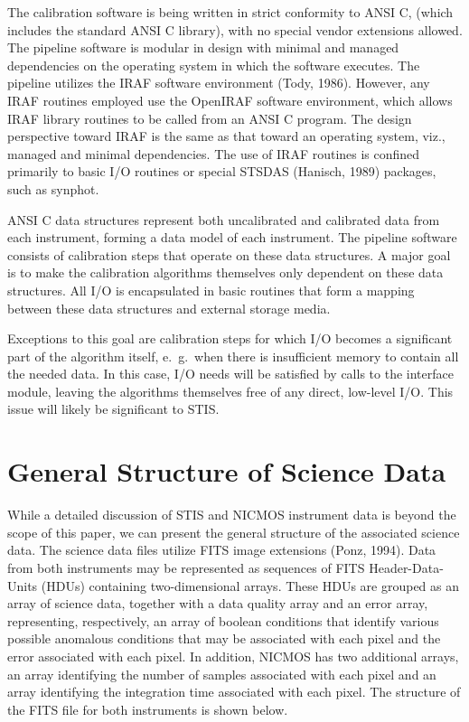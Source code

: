 The calibration software is being written in strict conformity to ANSI C, 
(which includes the standard ANSI C library), with no special vendor 
extensions allowed.  The pipeline software is modular in design with 
minimal and managed dependencies on the operating system in which the 
software executes.  The pipeline utilizes the IRAF software environment 
(Tody, 1986).  However, any IRAF routines employed use the OpenIRAF 
software environment, which allows IRAF library routines to be called 
from an ANSI C program.  The design perspective toward IRAF is the same 
as that toward an operating system, viz., managed and minimal 
dependencies.  The use of IRAF routines is confined primarily to basic I/O 
routines or special STSDAS (Hanisch, 1989) packages, such as synphot.

ANSI C data structures represent both uncalibrated and calibrated data
from each instrument, forming a data model of each instrument.  The
pipeline software consists of calibration steps that operate on these
data structures.  A major goal is to make the calibration algorithms
themselves only dependent on these data structures.  All I/O is
encapsulated in basic routines that form a mapping between these
data structures and external storage media. 

Exceptions to this goal are calibration steps for which I/O becomes a
significant part of the algorithm itself, e.\ g.\ when there is
insufficient memory to contain all the needed data.  In this case, I/O
needs will be satisfied by calls to the interface module, leaving the
algorithms themselves free of any direct, low-level I/O.  This issue
will likely be significant to STIS. 

\section{General Structure of Science Data}

While a detailed discussion of STIS and NICMOS instrument data is beyond
the scope of this paper, we can present the general structure of the
associated science data.  The science data files utilize FITS
image extensions (Ponz, 1994).  Data from both instruments may be
represented as sequences of FITS Header-Data-Units (HDUs) containing
two-dimensional arrays.  These HDUs are grouped as an array of science
data, together with a data quality array and an error array, representing,
respectively, an array of boolean conditions that identify various
possible anomalous conditions that may be associated with each pixel and
the error associated with each pixel.  In addition, NICMOS has two
additional arrays, an array identifying the number of samples associated
with each pixel and an array identifying the integration time associated
with each pixel.  The structure of the FITS file for both instruments is
shown below.

